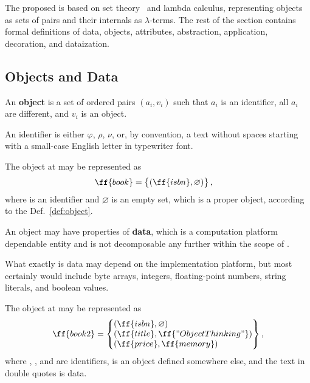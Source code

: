 The proposed \phic{} is based on set theory~\citep{jech2013set} and lambda calculus,
representing objects as sets of pairs and their internals as \(\lambda\)-terms.
The rest of the section contains formal definitions of
data, objects, attributes, abstraction, application, decoration, and dataization.

\subsection{Objects and Data}

\begin{definition}\label{def:object}
An \textbf{object} is a set of ordered pairs \((a_i, v_i)\) such that
\(a_i\) is an identifier, all \(a_i\) are different, and \(v_i\) is an object.
\end{definition}

An identifier is either \(\varphi\), \(\rho\), \(\nu\), or, by convention, a text without
spaces starting with a small-case English letter in typewriter font.

The object at  may be represented as
\begin{equation}\label{eq:book}
\begin{split}
\ff{book} & = \left\{\begin{matrix*}[l]
  (\ff{isbn}, \varnothing) \\
\end{matrix*}\right\},
\end{split}
\end{equation}
where  is an identifier and \(\varnothing\) is an empty
set, which is a proper object, according to the Def.~\ref{def:object}.

\begin{definition}\label{def:data}
An object may have properties of \textbf{data},
which is a computation platform dependable entity and is not
decomposable any further within the scope of \phic{}.
\end{definition}

What exactly is data may depend on the
implementation platform, but most certainly would include
byte arrays, integers, floating-point numbers,
string literals, and boolean values.

The object at  may be represented as
\begin{equation}\label{eq:book2}
\begin{split}
\ff{book2} & = \left\{\begin{matrix*}[l]
  (\ff{isbn}, \varnothing) \\
  (\ff{title}, \ff{"Object Thinking"}) \\
  (\ff{price}, \ff{memory}) \\
\end{matrix*}\right\}, \\
\end{split}
\end{equation}
where , , and  are identifiers,
 is an object defined somewhere else,
and the text in double quotes is data.

